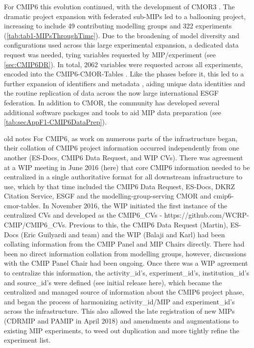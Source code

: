 \documentclass[manuscript]{copernicus}
\begin{document}
{For CMIP6 this evolution continued, with the development of CMOR3 \citep{mauzey_climate_2025}. The dramatic project expansion with federated sub-MIPs led to a ballooning project, increasing to include 49 contributing modelling groups and 322 experiments (\autoref{tab:tab1-MIPsThroughTime}). Due to the broadening of model diversity and configurations used across this large experimental expansion, a dedicated data request was needed, tying variables requested by MIP/experiment (see \autoref{sec:CMIP6DR}). In total, 2062 variables were requested across all experiments, encoded into the CMIP6-CMOR-Tables \citep{nadeau_cmip6_2017}. Like the phases before it, this led to a further expansion of identifiers and metadata \citep{taylor_pcmdi_2018}, aiding unique data identities and the routine replication of data across the now large international ESGF federation. In addition to CMOR, the community has developed several additional software packages and tools to aid MIP data preparation (see \autoref{tab:secAppF1-CMIP6DataPrep}).

old notes
For CMIP6, as work on numerous parts of the infrastructure began, their collation of CMIP6 project information occurred independently from one another (ES-Docs, CMIP6 Data Request, and WIP CVs). There was agreement at a WIP meeting in June 2016 (here) that core CMIP6 information needed to be centralized in a single authoritative format for all downstream infrastructure to use, which by that time included the CMIP6 Data Request, ES-Docs, DKRZ Citation Service, ESGF and the modelling-group-serving CMOR and cmip6-cmor-tables. In November 2016, the WIP initiated the first instance of the centralized CVs and developed as the CMIP6_CVs - https://github.com/WCRP-CMIP/CMIP6_CVs. Previous to this, the CMIP6 Data Request (Martin), ES-Docs (Eric Guilyardi and team) and the WIP (Balaji and Karl) had been collating information from the CMIP Panel and MIP Chairs directly. There had been no direct information collation from modelling groups, however, discussions with the CMIP Panel Chair had been ongoing. Once there was a WIP agreement to centralize this information, the activity_id’s, experiment_id’s, institution_id’s and source_id’s were defined (see initial release here), which became the centralized and managed source of information about the CMIP6 project phase, and began the process of harmonizing activity_id/MIP and experiment_id’s across the infrastructure. This also allowed the late registration of new MIPs (CDRMIP and PAMIP in April 2018) and amendments and augmentations to existing MIP experiments, to weed out duplication and more tightly refine the experiment list.

}
\end{document}

